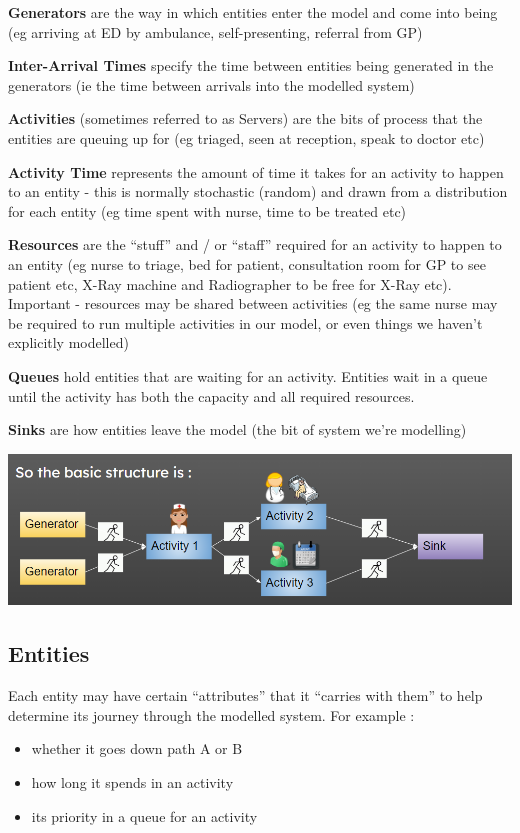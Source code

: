 \documentclass[
  letterpaper,
  DIV=11,
  numbers=noendperiod]{scrreprt}
\providecommand{\tightlist}{%
  \setlength{\itemsep}{0pt}\setlength{\parskip}{0pt}}\usepackage{longtable,booktabs,array}
\begin{document}
\textbf{Generators} are the way in which entities enter the model and
come into being (eg arriving at ED by ambulance, self-presenting,
referral from GP)

\textbf{Inter-Arrival Times} specify the time between entities being
generated in the generators (ie the time between arrivals into the
modelled system)

\textbf{Activities} (sometimes referred to as Servers) are the bits of
process that the entities are queuing up for (eg triaged, seen at
reception, speak to doctor etc)

\textbf{Activity Time} represents the amount of time it takes for an
activity to happen to an entity - this is normally stochastic (random)
and drawn from a distribution for each entity (eg time spent with nurse,
time to be treated etc)

\textbf{Resources} are the ``stuff'' and / or ``staff'' required for an
activity to happen to an entity (eg nurse to triage, bed for patient,
consultation room for GP to see patient etc, X-Ray machine and
Radiographer to be free for X-Ray etc). Important - resources may be
shared between activities (eg the same nurse may be required to run
multiple activities in our model, or even things we haven't explicitly
modelled)

\textbf{Queues} hold entities that are waiting for an activity. Entities
wait in a queue until the activity has both the capacity and all
required resources.

\textbf{Sinks} are how entities leave the model (the bit of system we're
modelling)

\includegraphics{images/des_steps.png}

\subsection{Entities}\label{entities}

Each entity may have certain ``attributes'' that it ``carries with
them'' to help determine its journey through the modelled system. For
example :

\begin{itemize}
\tightlist
\item
  whether it goes down path A or B
\item
  how long it spends in an activity
\item
  its priority in a queue for an activity
\end{itemize}
\end{document}
